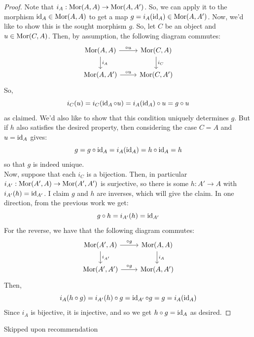 \documentclass[12pt]{exam}
\begin{document}
\begin{proof}
	Note that $i_A : \operatorname{Mor}(A,A) \to \operatorname{Mor}(A,A')$. So, we can apply it to the morphism $\operatorname{id}_A \in \operatorname{Mor}(A,A)$ to get a map $g = i_A(\operatorname{id}_A) \in \operatorname{Mor}(A,A')$. Now, we'd like to show this is the sought morphism $g$. So, let $C$ be an object and $u \in \operatorname{Mor}(C,A)$. Then, by assumption, the following diagram commutes:
	\[ \begin{tikzcd} \Mor(A,A) \arrow{r}{\circ u} \arrow{d}{i_A} & \Mor(C,A) \arrow{d}{i_C} \\ \Mor(A,A') \arrow{r}{\circ u} & \Mor(C,A') \end{tikzcd} \]
	So,
	\[ i_C(u) = i_C(\operatorname{id}_A \circ u) = i_A(\operatorname{id}_A) \circ u = g \circ u \]
	as claimed. We'd also like to show that this condition uniquely determines $g$. But if $h$ also satisfies the desired property, then considering the case $C = A$ and $u = \operatorname{id}_A$ gives:
	\[ g = g \circ \operatorname{id}_A = i_A(\operatorname{id}_A) = h \circ \operatorname{id}_A = h \]
	so that $g$ is indeed unique. \\
	
	Now, suppose that each $i_C$ is a bijection. Then, in particular $i_{A'} : \operatorname{Mor}(A',A) \to \operatorname{Mor}(A',A')$ is surjective, so there is some $h : A' \to A$ with $i_{A'}(h) = \operatorname{id}_{A'}$. I claim $g$ and $h$ are inverses, which will give the claim. In one direction, from the previous work we get:
	\[ g \circ h = i_{A'}(h) = \operatorname{id}_{A'} \]
	For the reverse, we have that the following diagram commutes:
	\[ \begin{tikzcd} \Mor(A',A) \arrow{r}{\circ g} \arrow{d}{i_{A'}} & \Mor(A,A) \arrow{d}{i_A} \\ \Mor(A',A') \arrow{r}{\circ g} & \Mor(A,A') \end{tikzcd} \]
	Then,
	\[ i_A(h \circ g) = i_{A'}(h) \circ g = \operatorname{id}_{A'} \circ g = g = i_A(\operatorname{id}_A) \]
	Since $i_A$ is bijective, it is injective, and so we get $h \circ g = \operatorname{id}_A$ as desired.
\end{proof}

 Skipped upon recommendation
\end{document}
